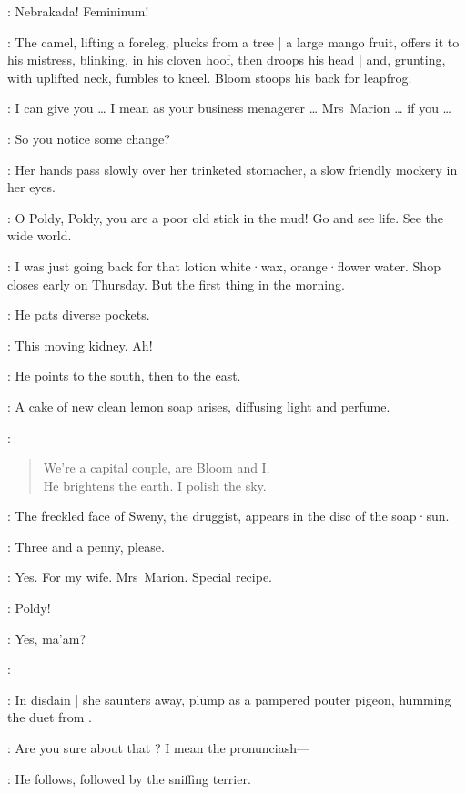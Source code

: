 \Marion:
Nebrakada!
Femininum!

:
The camel,
lifting a foreleg,
plucks from a tree |
a large mango fruit,
offers it to his mistress,
blinking,
in his cloven hoof,
then droops his head |
and,
grunting,
with uplifted neck,
fumbles to kneel.
Bloom stoops his back for leapfrog.

\Bloom:
I can give you \ldots
I mean as your business menagerer \ldots
Mrs~Marion \ldots
if you \ldots

\Marion:
So you notice some change?

:
Her hands pass slowly over her trinketed stomacher,
a slow friendly mockery in her eyes.

\Marion:
O Poldy,
Poldy,
you are a poor old stick in the mud!
Go and see life.
See the wide world.

\Bloom:
I was just going back for that lotion white·wax,
orange·flower water.
Shop closes early on Thursday.
But the first thing in the morning.

:
He pats diverse pockets.

\Bloom:
This moving kidney.
Ah!

:
He points to the south,
then to the east.

:
A cake of new clean lemon soap arises,
diffusing light and perfume.

\Soap:
\begin{verse}
    We're a capital couple, are Bloom and I.\\
    He brightens the earth. I polish the sky.
\end{verse}

:
The freckled face of Sweny,
the druggist,
appears in the disc of the soap·sun.

\Sweny:
Three and a penny,
please.

\Bloom:
Yes.
For my wife.
Mrs~Marion.
Special recipe.

\Marion:
Poldy!

\Bloom:
Yes,
ma'am?

\Marion:

:
In disdain |
she saunters away,
plump as a pampered pouter pigeon,
humming the duet from .

\Bloom:
Are you sure about that ?
I mean the pronunciash---

:
He follows,
followed by the sniffing terrier.

